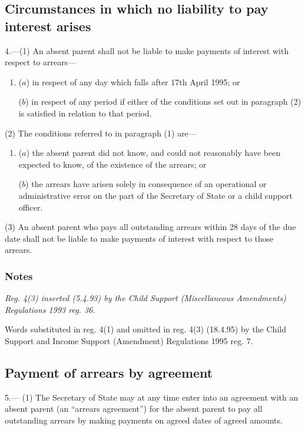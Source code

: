 \documentclass[a4paper]{article}
\newcommand\amendment[1]{\subsubsection*{Notes}{\itshape\frenchspacing\footnotesize #1 \par}}
\begin{document}
\subsection[4. Circumstances in which no liability to pay interest arises]{Circumstances in which no liability to pay interest arises}

4.—(1) An absent parent shall not be liable to make payments of interest 
with respect to arrears—
\begin{enumerate}\item[]
($a$) in respect of any day which falls after 17th April 1995; or

($b$) in respect of any period if either of the conditions set out in paragraph (2) is satisfied in relation to that period.
\end{enumerate}  %

(2) The conditions referred to in paragraph (1) are—
\begin{enumerate}\item[]
($a$) the absent parent did not know, and could not reasonably have been expected to know, of the existence of the arrears; or

($b$) the arrears have arisen solely in consequence of an operational or administrative error on the part of the Secretary of State or a child support officer.
\end{enumerate}

(3) An absent parent who pays all outstanding arrears 
within 28 days of the due date shall not be liable to make payments of interest with respect to those arrears.

\amendment{
Reg. 4(3) inserted (5.4.93) by the Child Support (Miscellaneous Amendments) Regulations 1993 reg. 36.

Words substituted in reg. 4(1) and omitted in reg. 4(3) (18.4.95) by the Child Support and Income Support (Amendment) Regulations 1995 reg. 7.
}

\subsection[5. Payment of arrears by agreement]{Payment of arrears by agreement}

5.—%
%
(1) The Secretary of State may at any time enter into an agreement with an absent parent (an “arrears agreement”) for the absent parent to pay all outstanding arrears by making payments on agreed dates of agreed amounts.
\end{document}
